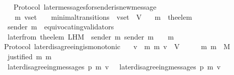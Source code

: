 \begin{isabellebody}
%
\isadelimproof
\ \ %
\endisadelimproof
%
\isatagproof
{}\isamarkupfalse%
%
\endisatagproof
{\isafoldproof}%
%
\isadelimproof
\isanewline
%
\endisadelimproof
\isanewline
\isanewline
{}\isamarkupfalse%
\ {\isacharparenleft}\ Protocol{\isacharparenright}\ later{\isacharunderscore}messages{\isacharunderscore}for{\isacharunderscore}sender{\isacharunderscore}is{\isacharunderscore}new{\isacharunderscore}message\ {\isacharcolon}\isanewline
\ \ {\isachardoublequoteopen}{\isasymforall}\ {\isasymsigma}\ {\isasymsigma}{\isacharprime}\ m{\isacharprime}\ v{\isacharunderscore}set{\isachardot}\ {\isacharparenleft}{\isasymsigma}{\isacharcomma}\ {\isasymsigma}{\isacharprime}{\isacharparenright}\ {\isasymin}\ minimal{\isacharunderscore}transitions\ {\isasymand}\ v{\isacharunderscore}set\ {\isasymsubseteq}\ V\isanewline
\ \ {\isasymlongrightarrow}\ m{\isacharprime}\ {\isacharequal}\ the{\isacharunderscore}elem\ {\isacharparenleft}{\isasymsigma}{\isacharprime}\ {\isacharminus}\ {\isasymsigma}{\isacharparenright}\isanewline
\ \ {\isasymlongrightarrow}\ sender\ m{\isacharprime}\ {\isasymnotin}\ equivocating{\isacharunderscore}validators\ {\isasymsigma}{\isacharprime}\isanewline
\ \ {\isasymlongrightarrow}\ later{\isacharunderscore}from\ {\isacharparenleft}the{\isacharunderscore}elem\ {\isacharparenleft}L{\isacharunderscore}H{\isacharunderscore}M\ {\isasymsigma}\ {\isacharparenleft}sender\ m{\isacharprime}{\isacharparenright}{\isacharparenright}{\isacharcomma}\ sender\ m{\isacharprime}{\isacharcomma}\ {\isasymsigma}{\isacharprime}{\isacharparenright}\ {\isacharequal}\ \ {\isacharbraceleft}m{\isacharprime}{\isacharbraceright}{\isachardoublequoteclose}\isanewline
%
\isadelimproof
\ \ %
\endisadelimproof
%
\isatagproof
{}\isamarkupfalse%
%
\endisatagproof
{\isafoldproof}%
%
\isadelimproof
\isanewline
%
\endisadelimproof
\isanewline
\isanewline
{}\isamarkupfalse%
\ {\isacharparenleft}\ Protocol{\isacharparenright}\ later{\isacharunderscore}disagreeing{\isacharunderscore}is{\isacharunderscore}monotonic{\isacharcolon}\isanewline
\ \ {\isachardoublequoteopen}{\isasymforall}\ v\ {\isasymsigma}\ m{}\ m{}{\isachardot}\ v\ {\isasymin}\ V\ {\isasymand}\ {\isasymsigma}\ {\isasymin}\ {\isasymSigma}\ {\isasymand}\ {\isacharbraceleft}m{}{\isacharcomma}\ m{}{\isacharbraceright}\ {\isasymsubseteq}\ M\isanewline
\ \ {\isasymlongrightarrow}\ justified\ m{}\ m{}\isanewline
\ \ {\isasymlongrightarrow}\ later{\isacharunderscore}disagreeing{\isacharunderscore}messages\ {\isacharparenleft}p{\isacharcomma}\ m{}{\isacharcomma}\ v{\isacharcomma}\ {\isasymsigma}{\isacharparenright}\ {\isasymsubseteq}\ later{\isacharunderscore}disagreeing{\isacharunderscore}messages\ {\isacharparenleft}p{\isacharcomma}\ m{}{\isacharcomma}\ v{\isacharcomma}\ {\isasymsigma}{\isacharparenright}{\isachardoublequoteclose}\isanewline

\end{isabellebody}
